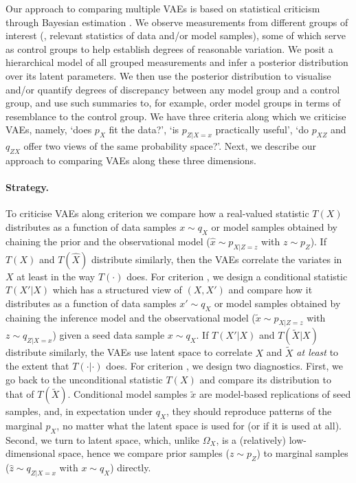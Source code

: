 Our approach to comparing multiple VAEs is based on statistical criticism through Bayesian estimation \citep{kruschke2013bayesian,benavoli2017time}. We observe measurements from different groups of interest (\ie, relevant statistics of data  and/or model samples), some of which serve as control groups to help establish degrees of reasonable variation. We posit a hierarchical model of all grouped measurements and infer a posterior distribution over its latent parameters. We then use the posterior distribution to visualise and/or quantify degrees of discrepancy between any model group and a control group, and use such summaries to, for example, order model groups in terms of resemblance to the control group.
We have three criteria along which we criticise VAEs, namely,
\enumone `does $p_{X}$ fit the data?', \enumtwo `is $p_{Z|X=x}$ practically useful', \enumthree `do $p_{XZ}$ and $q_{ZX}$ offer two views of the same probability space?'. Next, we describe our approach to comparing VAEs along these three dimensions.

\paragraph{Strategy.} To criticise VAEs along criterion \enumone we compare how a real-valued statistic $T(X)$ distributes as a function of data samples $x \sim q_X$ or model samples obtained by chaining the prior and the observational model ($\hat x \sim p_{X|Z=z}$ with $z \sim p_Z$). If $T(X)$ and $T(\hat X)$ distribute similarly, then the VAEs correlate the variates in $X$ at least in the way $T(\cdot)$ does.
For criterion \enumtwo, we design a conditional statistic $T(X'|X)$ which has a structured view of $(X,X')$ and compare how it distributes as a function of data samples $x' \sim q_X$ or model samples obtained by chaining the inference model and the observational model ($\tilde x \sim p_{X|Z=z}$ with $z \sim q_{Z|X=x}$) given a seed data sample $x \sim q_X$. If $T(X'|X)$ and $T(\tilde X|X)$ distribute similarly, the VAEs use latent space to correlate $X$ and $\tilde X$ \emph{at least} to the extent that $T(\cdot|\cdot)$ does.
For criterion \enumthree, we design two diagnostics. First, we go back to the unconditional statistic $T(X)$ and compare its distribution to that of $T(\tilde X)$. Conditional model samples $\tilde x$ are model-based replications of seed samples, and, in expectation under $q_X$, they should reproduce patterns of the marginal $p_X$, no matter what the latent space is used for (or if it is used at all).
Second, we turn to latent space, which, unlike $\Omega_X$, is a (relatively) low-dimensional space, hence we compare prior samples ($z \sim p_Z$) to marginal samples ($\hat z \sim q_{Z|X=x}$ with $x \sim q_X$) directly. %


